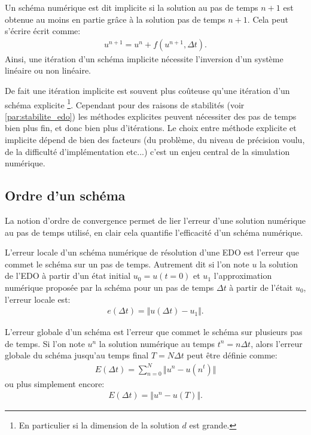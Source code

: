 \begin{definition}
    Un schéma numérique est dit implicite si la solution au pas  de temps $n+1$ est obtenue au moins en partie grâce à la solution pas de temps $n+1$. 
    Cela peut s'écrire écrit comme:
    \begin{align}
        u^{n+1} = u^n + f(u^{n+1} ,\Delta t ).
    \end{align}
    Ainsi, une itération d'un schéma implicite nécessite l'inversion d'un système linéaire ou non linéaire. 
\end{definition}
De fait une itération implicite est souvent plus coûteuse qu'une itération d'un schéma explicite
\footnote{En particulier si la dimension de la solution $d$ est grande.}. 
Cependant pour des raisons de stabilités (voir \ref{par:stabilite_edo}) les méthodes explicites peuvent nécessiter des pas de temps bien plus fin, et donc bien plus d'itérations.
Le choix entre méthode explicite et implicite dépend de bien des facteurs (du problème, du niveau de précision voulu, de la difficulté d'implémentation etc...)
c'est un enjeu central de la simulation numérique.
\subsection{Ordre d'un schéma}
La notion d'ordre de convergence permet de lier l'erreur d'une solution numérique au pas de temps utilisé, en clair cela quantifie l'efficacité d'un schéma numérique.
\begin{definition}
    L'erreur locale d'un schéma numérique de résolution d'une EDO est l'erreur que commet le schéma sur un pas de temps.
    Autrement dit si l'on note $u$ la solution de l'EDO à partir d'un état initial $u_0 = u(t=0)$ et $u_1$ l'approximation numérique proposée par la schéma 
    pour un pas de temps $\Delta t$ à partir de l'était $u_0$, l'erreur locale est: 
    \begin{align}
        e(\Delta t) = \Vert u(\Delta t) - u_1 \Vert.
    \end{align}
\end{definition}

\begin{definition}
    L'erreur globale d'un schéma est l'erreur que commet le schéma sur plusieurs pas de temps. 
    Si l'on note $u^n$ la solution numérique au temps $t^n = n \Delta t$, alors l'erreur globale du schéma jusqu'au temps final $T = N \Delta t$ peut être définie comme:
    \begin{align}
        E(\Delta t) = \sum_{n=0}^N \Vert u^n - u(n^t) \Vert 
    \end{align}
    ou plus simplement encore:
    \begin{align}
        E(\Delta t)=\Vert u^n - u(T) \Vert.
    \end{align}
\end{definition}


